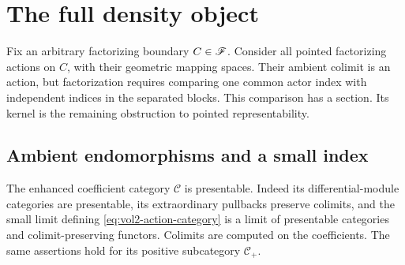 \section{The full density object}
\label{sec:vol2-action-density}

Fix an arbitrary factorizing boundary $C\in\mathscr F$.
Consider all pointed factorizing actions on $C$, with their geometric
mapping spaces. Their ambient colimit is an action, but factorization
requires comparing one common actor index with independent indices
in the separated blocks. This comparison has a section. Its kernel
is the remaining obstruction to pointed representability.

\subsection{Ambient endomorphisms and a small index}

The enhanced coefficient category $\mathscr C$ is presentable.
Indeed its differential-module categories are presentable, its
extraordinary pullbacks preserve colimits, and the small limit
defining \eqref{eq:vol2-action-category} is a limit of presentable
categories and colimit-preserving functors. Colimits are computed
on the coefficients. The same assertions hold for its positive
subcategory $\mathscr C_+$.

